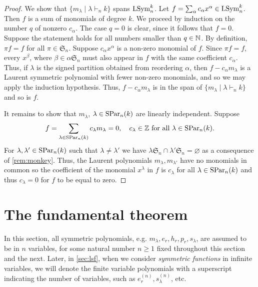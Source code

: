 \documentclass[11pt]{amsart}
\begin{document}
\begin{proof}
    We show that $\{m_\lambda \mid \lambda \vdash_n k\}$ spans $\mathrm{LSym}_n^k$. Let $f = \sum_\alpha c_\alpha x^\alpha \in \mathrm{LSym}_n^k$. Then $f$ is a sum of monomials of degree $k$. 
    We proceed by induction on the number $q$ of nonzero $c_\alpha$. 
    The case  $q=0$ is clear, since it follows that $f=0$. Suppose the statement holds for all numbers smaller than  $q \in \mathbb{N}$. By definition, $\pi f =f$ for all $\pi \in \mathfrak{S}_n$. Suppose \(c_\alpha x^\alpha\) is a non-zero monomial of \(f\).
    Since $\pi f =f$, every $ x^\beta$, where $\beta \in \alpha\mathfrak{S}_n$ must also appear in $f$ with the same coefficient $c_\alpha$. Thus, if \(\lambda\) is the signed partition obtained from reordering \(\alpha\), then \(f - c_\alpha m_\lambda\) is a Laurent symmetric polynomial with fewer non-zero monomials, and so we may apply the induction hypothesis. Thus, $f - c_\alpha m_\lambda$ is in the span of $\{m_\lambda \mid \lambda \vdash_n k\}$ and so is $f$. 

    It remains to show that $m_\lambda$, $\lambda \in \mathrm{SPar}_n(k)$ are linearly independent. Suppose 
    \begin{align}
        f = \sum_{\lambda \in \mathrm{SPar}_n(k)} c_\lambda m_\lambda =0, \quad c_\lambda \in \mathbb{Z} \text{ for all } \lambda \in \mathrm{SPar}_n(k). \label{eq:ldrel}
    \end{align}
    For \(\lambda, \lambda' \in \mathrm{SPar}_n(k)\) such that \(\lambda \neq \lambda'\) we have \(\lambda\mathfrak{S}_n \cap \lambda' \mathfrak{S}_n = \varnothing\) as a consequence of \cref{rem:monkey}. Thus, the Laurent polynomials \(m_\lambda, m_{\lambda'}\) have no monomials in common so the coefficient of the monomial $x^\lambda $ in $f$ is $c_\lambda$ for all \(\lambda \in \mathrm{SPar}_n (k)\) and thus   \(c_\lambda = 0\)  for $f$ to be equal to zero.
\end{proof}

\section{The fundamental theorem} \label{sec:ft}


In this section, all symmetric polynomials, e.g. $m_\lambda, e_r, h_r, p_r, s_\lambda$, are assumed to be in \(n\) variables, for some natural number $n\geq 1$ fixed throughout this section and the next. Later, in \cref{sec:lsf}, when we consider \textit{symmetric functions} in infinite variables, we will denote the finite variable polynomials with a superscript indicating the number of variables, such as $e_r^{(n)}, s_{\lambda}^{(n)}$, etc. 
\end{document}
